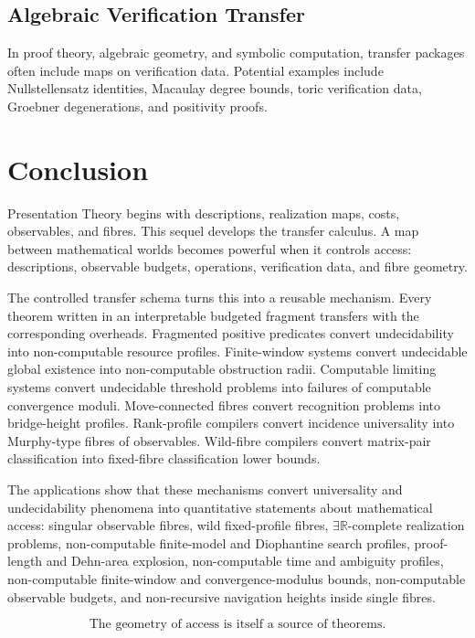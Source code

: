 \documentclass[11pt]{article}
\begin{document}
\subsection{Algebraic Verification Transfer}

In proof theory, algebraic geometry, and symbolic computation, transfer packages often include maps on verification data. Potential examples include Nullstellensatz identities, Macaulay degree bounds, toric verification data, Groebner degenerations, and positivity proofs.

\section{Conclusion}

Presentation Theory begins with descriptions, realization maps, costs, observables, and fibres. This sequel develops the transfer calculus. A map between mathematical worlds becomes powerful when it controls access: descriptions, observable budgets, operations, verification data, and fibre geometry.

The controlled transfer schema turns this into a reusable mechanism. Every theorem written in an interpretable budgeted fragment transfers with the corresponding overheads. Fragmented positive predicates convert undecidability into non-computable resource profiles. Finite-window systems convert undecidable global existence into non-computable obstruction radii. Computable limiting systems convert undecidable threshold problems into failures of computable convergence moduli. Move-connected fibres convert recognition problems into bridge-height profiles. Rank-profile compilers convert incidence universality into Murphy-type fibres of observables. Wild-fibre compilers convert matrix-pair classification into fixed-fibre classification lower bounds.

The applications show that these mechanisms convert universality and undecidability phenomena into quantitative statements about mathematical access: singular observable fibres, wild fixed-profile fibres, \(\exists\mathbb R\)-complete realization problems, non-computable finite-model and Diophantine search profiles, proof-length and Dehn-area explosion, non-computable time and ambiguity profiles, non-computable finite-window and convergence-modulus bounds, non-computable observable budgets, and non-recursive navigation heights inside single fibres.

\[
\boxed{
\text{The geometry of access is itself a source of theorems.}
}
\]
\end{document}

